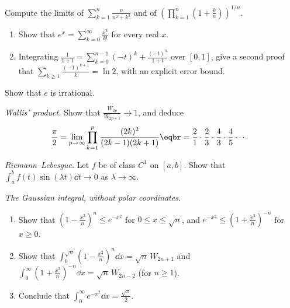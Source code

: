 \begin{exercise}[$\star$]\label{ex:riemann}
Compute the limits of $\displaystyle\sum_{k=1}^n\frac n{n^2+k^2}$ and of $\displaystyle\left(\prod_{k=1}^n\left(1+\frac kn\right)\right)^{1/n}$.
\end{exercise}

\begin{exercise}[$\star\star$]\label{ex:taylorln}
\begin{enumerate}[label=(\alph*)]
\item Show that $e^x=\sum_{k=0}^\infty\frac{x^k}{k!}$ for every real $x$.
\item Integrating $\frac1{1+t}=\sum_{k=0}^{n-1}(-t)^k+\frac{(-t)^n}{1+t}$ over $[0,1]$, give a second proof that $\sum_{k\ge1}\frac{(-1)^{k+1}}k=\ln2$, with an explicit error bound.
\end{enumerate}
\end{exercise}

\begin{exercise}[$\star\star$]\label{ex:eirr}
Show that $e$ is irrational.
\end{exercise}

\begin{exercise}[$\star\star$]\label{ex:wallisprod}
\emph{Wallis' product.} Show that $\displaystyle\frac{W_{2p}}{W_{2p+1}}\to1$, and deduce
\[
\begin{aligned}\frac\pi2&=\lim_{p\to\infty}\prod_{k=1}^p\frac{(2k)^2}{(2k-1)(2k+1)}\eqbr=\frac21\cdot\frac23\cdot\frac43\cdot\frac45\cdots\end{aligned}
\]
\end{exercise}

\begin{exercise}[$\star\star$]\label{ex:rl}
\emph{Riemann--Lebesgue.} Let $f$ be of class $C^1$ on $[a,b]$. Show that $\displaystyle\int_a^bf(t)\sin(\lambda t)\dd t\to0$ as $\lambda\to\infty$.
\end{exercise}

\begin{exercise}[$\star\star\star$]\label{ex:gaussian}
\emph{The Gaussian integral, without polar coordinates.}
\begin{enumerate}[label=(\alph*)]
\item Show that $\left(1-\frac{x^2}n\right)^n\le e^{-x^2}$ for $0\le x\le\sqrt n$, and $e^{-x^2}\le\left(1+\frac{x^2}n\right)^{-n}$ for $x\ge0$.
\item Show that $\int_0^{\sqrt n}\left(1-\frac{x^2}n\right)^n\dd x=\sqrt n\,W_{2n+1}$ and $\int_0^\infty\left(1+\frac{x^2}n\right)^{-n}\dd x=\sqrt n\,W_{2n-2}$ (for $n\ge1$).
\item Conclude that $\displaystyle\int_0^\infty e^{-x^2}\dd x=\frac{\sqrt\pi}2$.
\end{enumerate}
\end{exercise}

